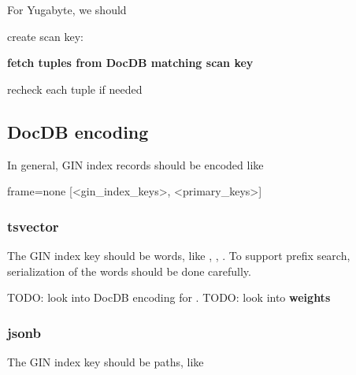 \documentclass[11pt]{article}
\begin{document}
For Yugabyte, we should

\begin{nparts}
\item
  create scan key: 
\item
  \textbf{fetch tuples from DocDB matching scan key}
\item
  recheck each tuple if needed
\end{nparts}

\hypertarget{docdb-encoding}{%
\subsection{DocDB encoding}\label{docdb-encoding}}

In general, GIN index records should be encoded like

\begin{textcode*}{frame=none}
[<gin_index_keys>, <primary_keys>]
\end{textcode*}

\hypertarget{tsvector}{%
\subsubsection{tsvector}\label{tsvector}}

The GIN index key should be words, like , ,
. To support prefix search, serialization of the words should
be done carefully.

TODO: look into DocDB encoding for . TODO: look into
 \textbf{weights}

\hypertarget{jsonb}{%
\subsubsection{jsonb}\label{jsonb}}

The GIN index key should be paths, like

\begin{oparts}
\item
\item
\item
\item
\item
\item
\item
\item
\end{oparts}
\end{document}
